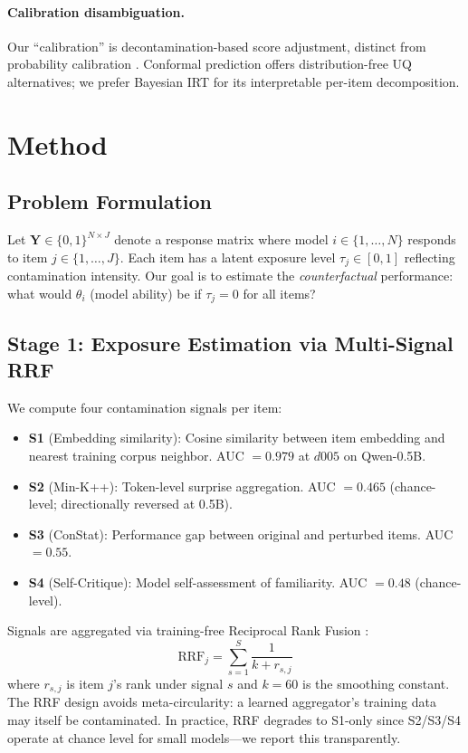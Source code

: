 \documentclass[11pt,a4paper]{article}
\begin{document}
\paragraph{Calibration disambiguation.} Our ``calibration'' is decontamination-based score adjustment, distinct from probability calibration \cite{guo2017calibration,platt1999probabilistic}. Conformal prediction \cite{angelopoulos2023conformal} offers distribution-free UQ alternatives; we prefer Bayesian IRT for its interpretable per-item decomposition.

\section{Method}

\subsection{Problem Formulation}

Let $\mathbf{Y} \in \{0,1\}^{N \times J}$ denote a response matrix where model $i \in \{1,\ldots,N\}$ responds to item $j \in \{1,\ldots,J\}$. Each item has a latent exposure level $\tau_j \in [0,1]$ reflecting contamination intensity. Our goal is to estimate the \emph{counterfactual} performance: what would $\theta_i$ (model ability) be if $\tau_j = 0$ for all items?

\subsection{Stage 1: Exposure Estimation via Multi-Signal RRF}

We compute four contamination signals per item:
\begin{itemize}
\item \textbf{S1} (Embedding similarity): Cosine similarity between item embedding and nearest training corpus neighbor. AUC $= 0.979$ at $d005$ on Qwen-0.5B.
\item \textbf{S2} (Min-K++): Token-level surprise aggregation. AUC $= 0.465$ (chance-level; directionally reversed at 0.5B).
\item \textbf{S3} (ConStat): Performance gap between original and perturbed items. AUC $= 0.55$.
\item \textbf{S4} (Self-Critique): Model self-assessment of familiarity. AUC $= 0.48$ (chance-level).
\end{itemize}

Signals are aggregated via training-free Reciprocal Rank Fusion \cite{cormack2009reciprocal}:
\begin{equation}
\text{RRF}_j = \sum_{s=1}^{S} \frac{1}{k + r_{s,j}}
\end{equation}
where $r_{s,j}$ is item $j$'s rank under signal $s$ and $k=60$ is the smoothing constant. The RRF design avoids meta-circularity: a learned aggregator's training data may itself be contaminated. In practice, RRF degrades to S1-only since S2/S3/S4 operate at chance level for small models---we report this transparently.
\end{document}
